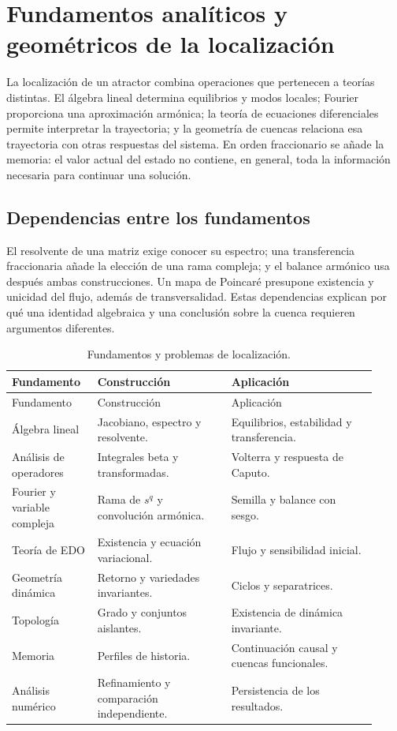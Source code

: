 \section{Fundamentos analíticos y geométricos de la localización}
\label{sec:ruta-biblioteca-local-drive}

La localización de un atractor combina operaciones que pertenecen a teorías
distintas. El álgebra lineal determina equilibrios y modos locales; Fourier
proporciona una aproximación armónica; la teoría de ecuaciones diferenciales
permite interpretar la trayectoria; y la geometría de cuencas relaciona esa
trayectoria con otras respuestas del sistema. En orden fraccionario se añade
la memoria: el valor actual del estado no contiene, en general, toda la
información necesaria para continuar una solución.

\subsection{Dependencias entre los fundamentos}
\label{sec:ruta-unica-estudio}

El resolvente de una matriz exige conocer su espectro; una transferencia
fraccionaria añade la elección de una rama compleja; y el balance armónico
usa después ambas construcciones. Un mapa de Poincaré presupone existencia
y unicidad del flujo, además de transversalidad. Estas dependencias explican
por qué una identidad algebraica y una conclusión sobre la cuenca requieren
argumentos diferentes.

\begin{longtable}{@{}L{0.21\linewidth}L{0.34\linewidth}L{0.37\linewidth}@{}}
\caption{Fundamentos y problemas de localización.}
\label{tab:ruta-unica-biblioteca}\\
\toprule
Fundamento & Construcción & Aplicación\\
\midrule
\endfirsthead
\toprule
Fundamento & Construcción & Aplicación\\
\midrule
\endhead
Álgebra lineal & Jacobiano, espectro y resolvente. & Equilibrios, estabilidad y transferencia.\\
Análisis de operadores & Integrales beta y transformadas. & Volterra y respuesta de Caputo.\\
Fourier y variable compleja & Rama de $s^q$ y convolución armónica. & Semilla y balance con sesgo.\\
Teoría de EDO & Existencia y ecuación variacional. & Flujo y sensibilidad inicial.\\
Geometría dinámica & Retorno y variedades invariantes. & Ciclos y separatrices.\\
Topología & Grado y conjuntos aislantes. & Existencia de dinámica invariante.\\
Memoria & Perfiles de historia. & Continuación causal y cuencas funcionales.\\
Análisis numérico & Refinamiento y comparación independiente. & Persistencia de los resultados.\\
\bottomrule
\end{longtable}

